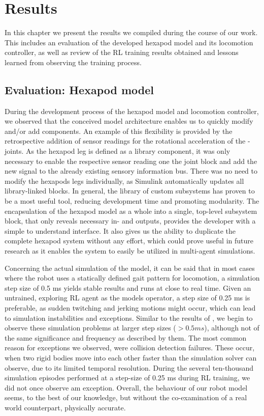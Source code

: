 \chapter{Results}
\label{ch:results}

In this chapter we present the results we compiled during the course of our work.
This includes an evaluation of the developed hexapod model and its locomotion controller, as well as review of the RL training results obtained and lessons learned from observing the training process.

\section{Evaluation: Hexapod model}
During the development process of the hexapod model and locomotion controller, we observed that the conceived model architecture enables us to quickly modify and/or add components.
An example of this flexibility is provided by the retrospective addition of sensor readings for the rotational acceleration of the \textalpha-joints.
As the hexapod leg is defined as a library component, it was only necessary to enable the respective sensor reading one the joint block and add the new signal to the already existing sensory information bus. 
There was no need to modify the hexapods legs individually, as Simulink automatically updates all library-linked blocks.
In general, the library of custom subsystems has proven to be a most useful tool, reducing development time and promoting modularity.
The encapsulation of the hexapod model as a whole into a single, top-level subsystem block, that only reveals necessary in- and outputs, provides the developer with a simple to understand interface.
It also gives us the ability to duplicate the complete hexapod system without any effort, which could prove useful in future research as it enables the system to easily be utilized in multi-agent simulations.

Concerning the actual simulation of the model, it can be said that in most cases where the robot uses a statically defined gait pattern for locomotion, a simulation step size of 0.5 ms yields stable results and runs at close to real time.
Given an untrained, exploring RL agent as the models operator, a step size of 0.25 ms is preferable, as sudden twitching and jerking motions might occur, which can lead to simulation instabilities and exceptions.
Similar to the results of \cite{thilderkvist2015motion}, we begin to observe these simulation problems at larger step sizes ($> 0.5 ms$), although not of the same significance and frequency as described by them. 
The most common reason for exceptions we observed, were collision detection failures.
These occur, when two rigid bodies move into each other faster than the simulation solver can observe, due to its limited temporal resolution.
During the several ten-thousand simulation episodes performed at a step-size of 0.25 ms during RL training, we did not once observe am exception.
Overall, the behaviour of our robot model seems, to the best of our knowledge, but without the co-examination of a real world counterpart, physically accurate.


